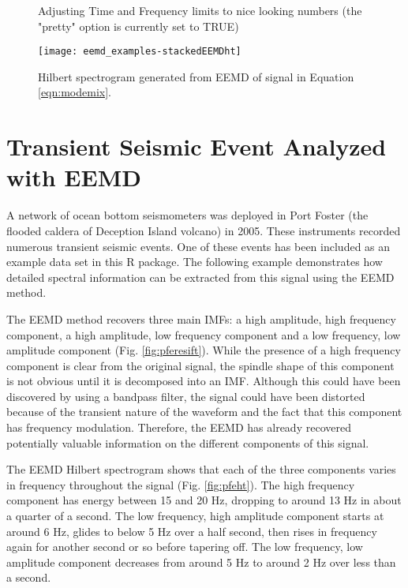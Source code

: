 \documentclass[12pt]{article}
\begin{document}
\begin{figure}[ht]
\begin{center}
\begin{Schunk}
\begin{Soutput}
Adjusting Time and Frequency limits to nice looking numbers (the "pretty" option is currently set to TRUE)
\end{Soutput}
\end{Schunk}
\texttt{[image: eemd\_examples-stackedEEMDht]}
\end{center}
\caption{Hilbert spectrogram generated from EEMD of signal in Equation \ref{eqn:modemix}.}
\label{fig:stackedEEMDht}
\end{figure}

\FloatBarrier

\section{Transient Seismic Event Analyzed with EEMD}

A network of ocean bottom seismometers was deployed in Port Foster  (the flooded caldera of Deception Island volcano) in 2005.
These instruments recorded numerous transient seismic events.
One of these events has been included as an example data set in this R package.
The following example demonstrates how detailed spectral information can be extracted from this signal using the EEMD method.

The EEMD method recovers three main IMFs: a high amplitude, high frequency component, a high amplitude, low frequency component and a low frequency, low amplitude component (Fig. \ref{fig:pferesift}).
While the presence of a high frequency component is clear from the original signal, the spindle shape of this component is not obvious until it is decomposed into an IMF.
Although this could have been discovered by using a bandpass filter, the signal could have been distorted because of the transient nature of the waveform and the fact that this component has frequency modulation.
Therefore, the EEMD has already recovered potentially valuable information on the different components of this signal.

The EEMD Hilbert spectrogram shows that each of the three components varies in frequency throughout the signal (Fig. \ref{fig:pfeht}).
The high frequency component has energy between 15 and 20 Hz, dropping to around 13 Hz in about a quarter of a second.
The low frequency, high amplitude component starts at around 6 Hz, glides to below 5 Hz over a half second, then rises in frequency again for another second or so before tapering off.
The low frequency, low amplitude component decreases from around 5 Hz to around 2 Hz over less than a second.
\end{document}
